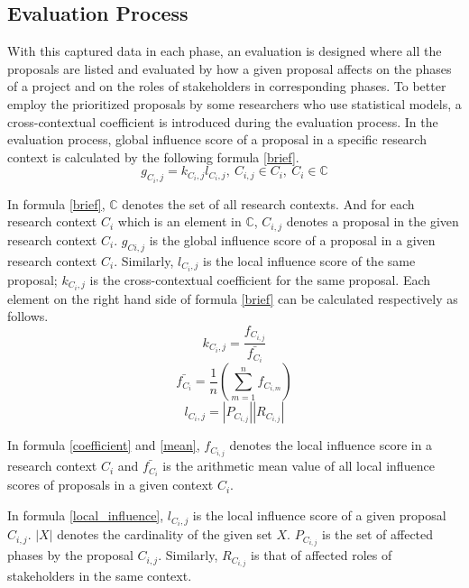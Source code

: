 \subsection{Evaluation Process}
With this captured data in each phase, an evaluation is designed where all the proposals are listed and evaluated by how a given proposal affects on the phases of a project and on the roles of stakeholders in corresponding phases. To better employ the prioritized proposals by some researchers who use statistical models, a cross-contextual coefficient is introduced during the evaluation process. In the evaluation process, global influence score of a proposal in a specific research context is calculated by the following formula \ref{brief}.
\begin{equation}
g_{C_{i},j} = \mathit{k_{C_{i},j}}l_{C_{i},j},\ C_{i,j} \in C_{i},\ C_{i} \in \mathbb{C}
\label{brief}
\end{equation}

In formula \ref{brief}, $\mathbb{C}$ denotes the set of all research contexts. And for each research context $C_{i}$ which is an element in $\mathbb{C}$, $C_{i,j}$ denotes a proposal in the given research context $C_{i}$. $g_{Ci,j}$ is the global influence score of a proposal in a given research context $C_{i}$. Similarly, $l_{C_{i},j}$ is the local influence score of the same proposal; $\mathit{k_{C_{i},j}}$ is the cross-contextual coefficient for the same proposal. Each element on the right hand side of formula \ref{brief} can be calculated respectively as follows.
\begin{equation}
\mathit{k_{C_{i},j}} = \frac{f_{C_{i,j}}}{\bar{f_{C_i}}}
\label{coefficient}
\end{equation}
\begin{equation}
\bar{f_{C_i}} = \frac{1}{n}\left (\sum_{m=1}^n{f_{C_{i,m}}}\right)
\label{mean}
\end{equation}
\begin{equation}
l_{C_{i},j} = |P_{C_{i,j}}||R_{C_{i,j}}|
\label{local_influence}
\end{equation}

In formula \ref{coefficient} and \ref{mean}, $f_{C_{i,j}}$ denotes the local influence score in a research context $C_{i}$ and $\bar{f_{C_i}}$ is the arithmetic mean value of all local influence scores of proposals in a given context $C_{i}$.

In formula \ref{local_influence}, $l_{C_{i},j}$ is the local influence score of a given proposal $C_{i,j}$. $|X|$ denotes the cardinality of the given set $X$. $P_{C_{i,j}}$ is the set of affected phases by the proposal $C_{i,j}$. Similarly, $R_{C_{i,j}}$ is that of affected roles of stakeholders in the same context.

